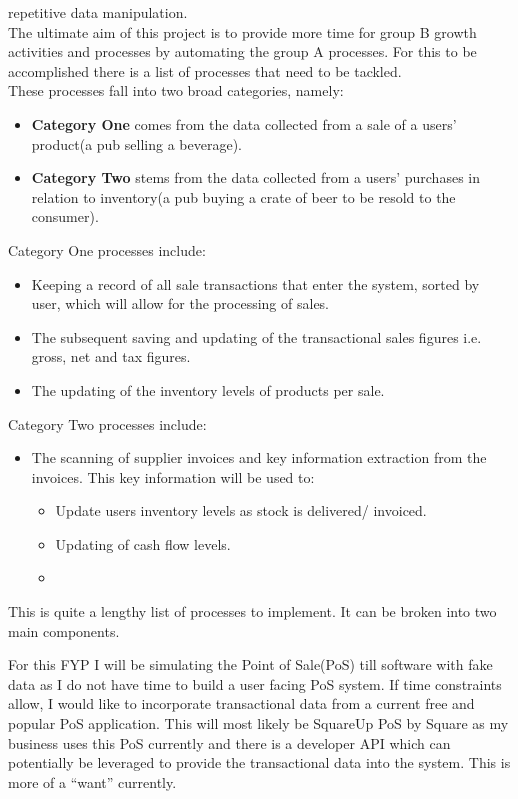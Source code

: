 \begin{flushleft}
	repetitive data manipulation.\\
	The ultimate aim of this project is to provide more time for group B growth activities and processes by automating the group A processes. For this to be accomplished there is a list of processes that 
	need to be tackled. \\ These processes fall into two broad categories, namely:
	\begin{itemize}
		\item \textbf{Category One} comes from the data collected from a sale of a users' product(a pub selling a beverage).
		\item \textbf{Category Two} stems from the data collected from a users' purchases in relation to inventory(a pub buying a crate of beer to be resold to the consumer).
		\end{itemize}
	Category One processes include:
	\begin{itemize}
		\item Keeping a record of all sale transactions that enter the system, sorted by user, which will allow for the processing of sales.
		\item The subsequent saving and updating of the transactional sales figures i.e. gross, net and tax figures.
		\item The updating of the inventory levels of products per sale.
	\end{itemize}
	Category Two processes include:
	\begin{itemize}
		\item The scanning of supplier invoices and key information extraction from the invoices. This key information will be used to:
		\begin{itemize}
			      \item Update users inventory levels as stock is delivered/ invoiced.
			      \item Updating of cash flow levels.
			      \item 
		      \end{itemize}
	\end{itemize}

	This is quite a lengthy list of processes to implement. It can be broken into two main components. 

	 For this FYP I will be simulating the Point of Sale(PoS) till software with fake data as I do not have time to build a user facing PoS system.
	If time constraints allow, I would like to incorporate transactional data from a current free and popular PoS application. This will most likely be SquareUp PoS by Square as my business uses this PoS currently and there is a developer API which can potentially be leveraged to provide the transactional data into the system. This is more of a “want” currently.


\end{flushleft}
